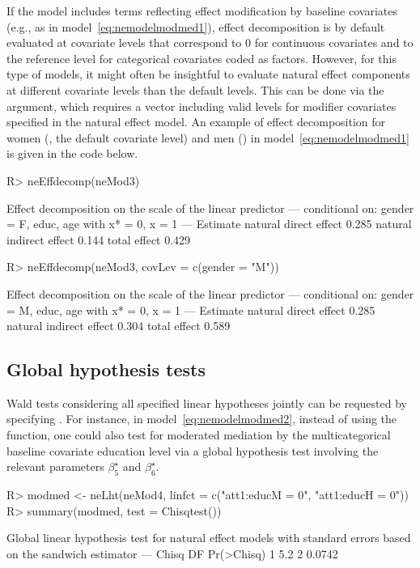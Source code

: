 \documentclass[nojss]{jss}
\begin{document}
\par If the model includes terms reflecting effect modification by baseline covariates (e.g., as in model~\eqref{eq:nemodelmodmed1}), effect decomposition is by default evaluated at covariate levels that correspond to 0 for continuous covariates and to the reference level for categorical covariates coded as factors. However, for this type of models, it might often be insightful to evaluate natural effect components at different covariate levels than the default levels. This can be done via the  argument, which requires a vector including valid levels for modifier covariates specified in the natural effect model. An example of effect decomposition for women (, the default covariate level) and men () in model~\eqref{eq:nemodelmodmed1} is given in the  code below.
\begin{Schunk}
\begin{Sinput}
R> neEffdecomp(neMod3)
\end{Sinput}
\begin{Soutput}
Effect decomposition on the scale of the linear predictor
---
conditional on: gender = F, educ, age 
with x* = 0, x = 1 
---
                        Estimate
natural direct effect      0.285
natural indirect effect    0.144
total effect               0.429
\end{Soutput}
\begin{Sinput}
R> neEffdecomp(neMod3, covLev = c(gender = "M"))
\end{Sinput}
\begin{Soutput}
Effect decomposition on the scale of the linear predictor
---
conditional on: gender = M, educ, age 
with x* = 0, x = 1 
---
                        Estimate
natural direct effect      0.285
natural indirect effect    0.304
total effect               0.589
\end{Soutput}
\end{Schunk}

\subsection{Global hypothesis tests}
Wald tests considering all specified linear hypotheses jointly can be requested by specifying . For instance, in model~\eqref{eq:nemodelmodmed2}, instead of using the  function, one could also test for moderated mediation by the multicategorical baseline covariate education level via a global hypothesis test involving the relevant parameters $\beta^\star_5$ and $\beta^\star_6$.
\begin{Schunk}
\begin{Sinput}
R> modmed <- neLht(neMod4, linfct = c("att1:educM = 0", "att1:educH = 0"))
R> summary(modmed, test = Chisqtest())
\end{Sinput}
\begin{Soutput}
Global linear hypothesis test for natural effect models
with standard errors based on the sandwich estimator
---
  Chisq DF Pr(>Chisq)
1   5.2  2     0.0742
\end{Soutput}
\end{Schunk}
\end{document}
